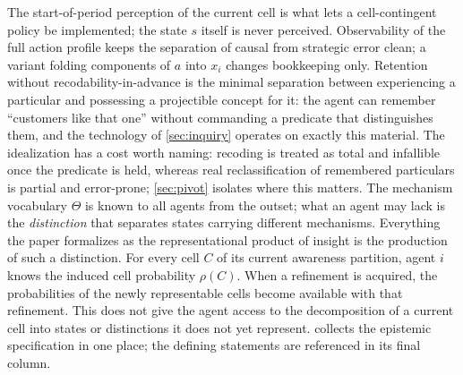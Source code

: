 \documentclass[11pt]{article}
\theoremstyle{definition}
\begin{document}
The start-of-period perception of the current cell is what lets a cell-contingent policy be implemented; the state $s$ itself is never perceived.
Observability of the full action profile keeps the separation of causal from strategic error clean; a variant folding components of $a$ into $x_i$ changes bookkeeping only.
Retention without recodability-in-advance is the minimal separation between experiencing a particular and possessing a projectible concept for it: the agent can remember ``customers like that one'' without commanding a predicate that distinguishes them, and the technology of \cref{sec:inquiry} operates on exactly this material.
The idealization has a cost worth naming: recoding is treated as total and infallible once the predicate is held, whereas real reclassification of remembered particulars is partial and error-prone; \cref{sec:pivot} isolates where this matters.
The mechanism vocabulary $\Theta$ is known to all agents from the outset; what an agent may lack is the \emph{distinction} that separates states carrying different mechanisms.
Everything the paper formalizes as the representational product of insight is the production of such a distinction.
For every cell \(C\) of its current awareness partition, agent \(i\) knows the induced cell probability \(\rho(C)\).
When a refinement is acquired, the probabilities of the newly representable cells become available with that refinement.
This does not give the agent access to the decomposition of a current cell into states or distinctions it does not yet represent.
 collects the epistemic specification in one place; the defining statements are referenced in its final column.
\end{document}
